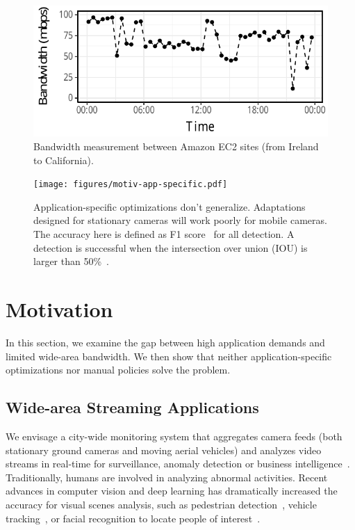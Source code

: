 \begin{figure}
  \centering
  \includegraphics[width=.95\linewidth]{figures/aws-variation.pdf}
  \caption{Bandwidth measurement between Amazon EC2 sites (from Ireland to
    California).}
  \label{fig:bw}
\end{figure}

\begin{figure}
  \centering
  \texttt{[image: figures/motiv-app-specific.pdf]}
  \caption{Application-specific optimizations don't generalize. Adaptations
    designed for stationary cameras will work poorly for mobile cameras. The
    accuracy here is defined as F1 score~\cite{Rijsbergen:1979:IR:539927} for
    all detection. A detection is successful when the intersection over union
    (IOU) is larger than 50\%~\cite{everingham2010pascal}.}
  \label{fig:app-specific}
\end{figure}

\section{Motivation}
\label{sec:motivation}

In this section, we examine the gap between high application demands and limited
wide-area bandwidth. We then show that neither application-specific
optimizations nor manual policies solve the problem.

\subsection{Wide-area Streaming Applications}
\label{sec:wide-area-streaming}

 We envisage a city-wide monitoring system that
aggregates camera feeds (both stationary ground cameras and moving aerial
vehicles) and analyzes video streams in real-time for surveillance, anomaly
detection or business intelligence~\cite{oh2011large}. Traditionally, humans are
involved in analyzing abnormal activities. Recent advances in computer vision
and deep learning has dramatically increased the accuracy for visual scenes
analysis, such as pedestrian detection~\cite{dollar2012pedestrian}, vehicle
tracking~\cite{coifman1998real}, or facial recognition to locate people of
interest~\cite{parkhi2015deep, Lu:2015:SHF:2888116.2888245}.

